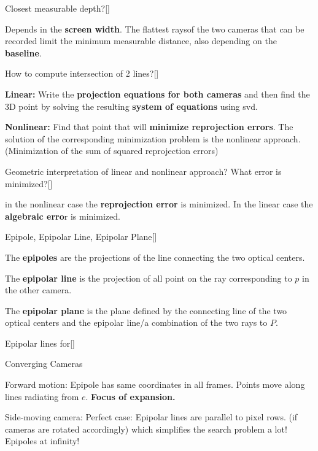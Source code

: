 \documentclass[10pt,a4paper]{scrartcl}
\begin{document}
\begin{multicols*}{2}
\begin{QandA}
{Closest measurable depth?}[\Application]
\item Depends in the \textbf{screen width}. The \glqq flattest rays\grqq of the two cameras that can be recorded limit the minimum measurable distance, also depending on the \textbf{baseline}.
\end{QandA}

\begin{QandA}
{How to compute intersection of 2 lines?}[\Application]
\item \textbf{Linear:} Write the \textbf{projection equations for both cameras} and then find the 3D point by solving the resulting \textbf{system of equations} using svd.
\item \textbf{Nonlinear:} Find that point that will \textbf{minimize reprojection errors}. The solution of the corresponding minimization problem is the nonlinear approach. (Minimization of the sum of squared reprojection errors)
\end{QandA}

\begin{QandA}
{Geometric interpretation of linear and nonlinear approach? What error is minimized?}[\Application]
\item in the nonlinear case the \textbf{reprojection error} is minimized. In the linear case the \textbf{algebraic erro}r is minimized.
\end{QandA}

\begin{QandA}
{Epipole, Epipolar Line, Epipolar Plane}[\Definition]
\item The \textbf{epipoles} are the projections of the line connecting the two optical centers.
\item The \textbf{epipolar line} is the projection of all point on the ray corresponding to $p$ in the other camera.
\item The \textbf{epipolar plane} is the plane defined by the connecting line of the two optical centers and the epipolar line/a combination of the two rays to $P$.
\end{QandA}

\begin{QandA}
{Epipolar lines for}[\Comparison]
\item Converging Cameras
\item Forward motion: Epipole has same coordinates in all frames. Points move along lines radiating from $e$. \textbf{Focus of expansion.}
\item Side-moving camera: Perfect case: Epipolar lines are parallel to pixel rows. (if cameras are rotated accordingly) which simplifies the search problem a lot! Epipoles at infinity!
\end{QandA}


\end{multicols*}
\end{document}
